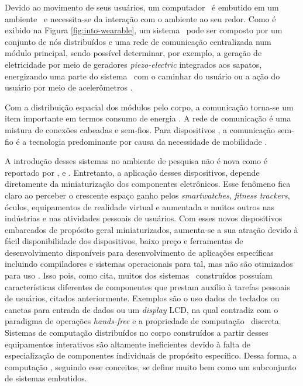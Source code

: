 	Devido ao movimento de seus usuários, um computador \wearable\ é embutido em um ambiente \mobile\ e necessita-se da interação com o ambiente ao seu redor.
	Como é exibido na Figura \ref{fig:into-wearable}, um sistema \wearable\ pode ser composto por um conjunto de nós distribuídos e uma rede de comunicação centralizada num módulo principal, sendo possível determinar, por exemplo, a geração de eletricidade por meio de geradores \textit{piezo-electric} integrados aos sapatos, energizando uma parte do sistema \wearable\ com o caminhar do usuário \citep{Kymissis1998} ou a ação do usuário por meio de acelerômetros \citep{VanLaerhoven2002, Kern2002}.

	Com a distribuição espacial dos módulos pelo corpo, a comunicação torna-se um item importante em termos consumo de energia \citep{Kymissis1998}.
   A rede de comunicação é uma mistura de conexões cabeadas e sem-fios.
   Para dispositivos \wearables, a comunicação sem-fio é a tecnologia predominante por causa da necessidade de mobilidade \citep{Plessl2003}.

	A introdução desses sistemas no ambiente de pesquisa não é nova como é reportado por \citet{Sutherland1968}, \citet{Mann1996} e \citet{Mann1997}.
   Entretanto, a aplicação desses dispositivos, depende diretamente da miniaturização dos componentes eletrônicos.
   Esse fenômeno fica claro ao perceber o crescente espaço ganho pelos \textit{smartwatches}, \textit{fitness trackers}, óculos, equipamentos de realidade virtual e aumentada e muitos outros nas indústrias e nas atividades pessoais de usuários.
   Com esses novos dispositivos embarcados de propósito geral miniaturizados, aumenta-se a sua atração devido à fácil disponibilidade dos dispositivos, baixo preço e ferramentas de desenvolvimento disponíveis para desenvolvimento de aplicações específicas incluindo compiladores e sistemas operacionais para tal, mas não são otimizados para uso \wearable.
	Isso pois, como \citeauthor{Plessl2003} cita, muitos dos sistemas \wearables\ construídos possuíam características diferentes de componentes que prestam auxílio à tarefas pessoais de usuários, citados anteriormente.
	Exemplos são o uso dados de teclados ou canetas para entrada de dados ou um \textit{display} LCD, na qual contradiz com o paradigma de operações \textit{hands-free} e a propriedade de computação \wearable\ discreta.
	Sistemas de computação distribuídos no corpo construídos a partir desses equipamentos interativos são altamente ineficientes devido à falta de especialização de componentes individuais de propósito específico.
	Dessa forma, a computação \wearable, seguindo esse conceitos, se define muito bem como um subconjunto de sistemas embutidos.


